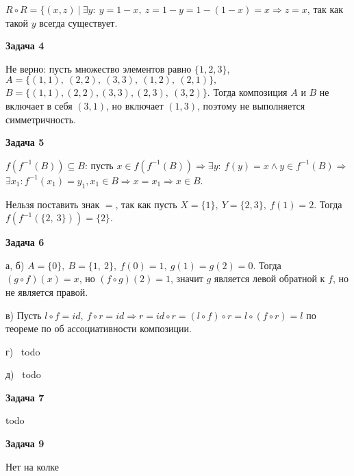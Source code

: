$\displaystyle R\circ R=\{( x,z) \ |\ \exists y:\ y=1-x,\ z=1-y=1-( 1-x) =x\Longrightarrow z=x$, так как такой $\displaystyle y$ всегда существует.

\begin{center}
\textbf{Задача 4}
\end{center}
Не верно: пусть множество элементов равно $\displaystyle \{1,2,3\}$, $\displaystyle A=\{( 1,1) ,\ ( 2,2) ,\ ( 3,3) ,\ ( 1,2) ,\ ( 2,1)\} ,$ $\displaystyle B=\{( 1,1) ,( 2,2) ,( 3,3) ,( 2,3) ,\ ( 3,2)\}$. Тогда композиция $\displaystyle A$ и $\displaystyle B$ не включает в себя $\displaystyle ( 3,1)$, но включает $\displaystyle ( 1,3)$, поэтому не выполняется симметричность.

\begin{center}
\textbf{Задача 5}
\end{center}
$\displaystyle f\left( f^{-1}( B)\right) \subseteq B$: пусть $\displaystyle x\in f\left( f^{-1}( B)\right) \Longrightarrow \exists y:\ f( y) =x\land y\in f^{-1}( B) \Longrightarrow $ $\displaystyle \exists x_{1} :f^{-1}( x_{1}) =y_{1} ,x_{1} \in B\Longrightarrow $$\displaystyle x=x_{1} \Longrightarrow x\in B$.

Нельзя поставить знак $\displaystyle =$, так как пусть $\displaystyle X=\{1\} ,\ Y=\{2,3\} ,\ f( 1) =2$. Тогда $\displaystyle f\left( f^{-1}(\{2,\ 3\})\right) =\{2\}$.

\begin{center}
\textbf{Задача 6}
\end{center}
а, б) $\displaystyle A=\{0\} ,\ B=\{1,\ 2\} ,\ f( 0) =1,\ g( 1) =g( 2) =0$. Тогда $\displaystyle ( g\circ f)( x) =x$, но $\displaystyle ( f\circ g)( 2) =1$, значит $\displaystyle g$ является левой обратной к $\displaystyle f$, но не является правой.

в) Пусть $\displaystyle l\circ f=id,\ f\circ r=id\Longrightarrow r=id\circ r=( l\circ f) \circ r=l\circ ( f\circ r) =l$ по теореме по об ассоциативности композиции.

г) \ todo

д) \ todo

\begin{center}
\textbf{Задача 7}
\end{center}
todo
\begin{center}
\textbf{Задача 9}
\end{center}
Нет на колке